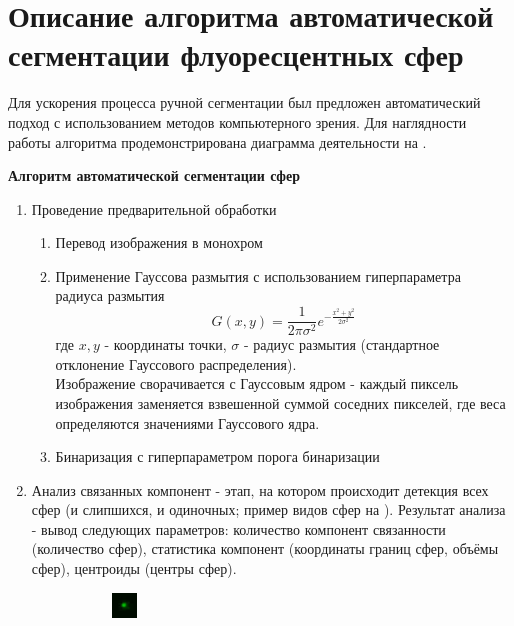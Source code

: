 \section{Описание алгоритма автоматической сегментации флуоресцентных сфер} \label{c2:sec2}
\par Для ускорения процесса ручной сегментации был предложен автоматический подход с использованием методов компьютерного зрения. Для наглядности работы алгоритма продемонстрирована диаграмма деятельности на .
\par \textbf{Алгоритм автоматической сегментации сфер}
\begin{enumerate}
	\item Проведение предварительной обработки
	\begin{enumerate}[]
		\item Перевод изображения в монохром
		\item Применение Гауссова размытия с использованием гиперпараметра радиуса размытия
		\begin{equation}
			G(x,y) = \frac{1}{2\pi\sigma^2}e^{-\frac{x^2+y^2}{2\sigma^2}}
		\end{equation}
		где $x, y$ - координаты точки, $\sigma$ - радиус размытия (стандартное отклонение Гауссового распределения).\\
		Изображение сворачивается с Гауссовым ядром -  каждый пиксель изображения заменяется взвешенной суммой соседних пикселей, где веса определяются значениями Гауссового ядра.
		\item Бинаризация с гиперпараметром порога бинаризации
	\end{enumerate}
	\item Анализ связанных компонент \cite[с. 679-682]{connected-components-2008} - этап, на котором происходит детекция всех сфер (и слипшихся, и одиночных; пример видов сфер на ). Результат анализа - вывод следующих параметров: количество компонент связанности (количество сфер), статистика компонент (координаты границ сфер, объёмы сфер), центроиды (центры сфер).
	\begin{figure}[H]
		\begin{subfigure}[t]{\dimexpr.5\linewidth-0.5em\relax}
			\centering
			\includegraphics[width=.2\linewidth,valign=t]{my_folder/images/autosegm/good_bead.png}

\end{subfigure}
\end{figure}
\end{enumerate}
